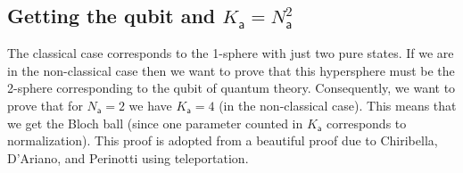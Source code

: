 \documentclass[10pt]{article}
\begin{document}
\subsection{Getting the qubit and $K_\mathsf{a}=N_\mathsf{a}^2$}

The classical case corresponds to the 1-sphere with just two pure states.   If we are in the non-classical case then we want to prove that this hypersphere must be the 2-sphere corresponding to the qubit of quantum theory.   Consequently, we want to prove that for $N_\mathsf{a}=2$ we have $K_\mathsf{a}=4$ (in the non-classical case). This means that we get the Bloch ball (since one parameter counted in $K_\mathsf{a}$ corresponds to normalization).  This proof is adopted from a beautiful proof due to Chiribella, D'Ariano, and Perinotti \cite{chiribella2010probabilistic, chiribella2010informational} using teleportation.
\end{document}
